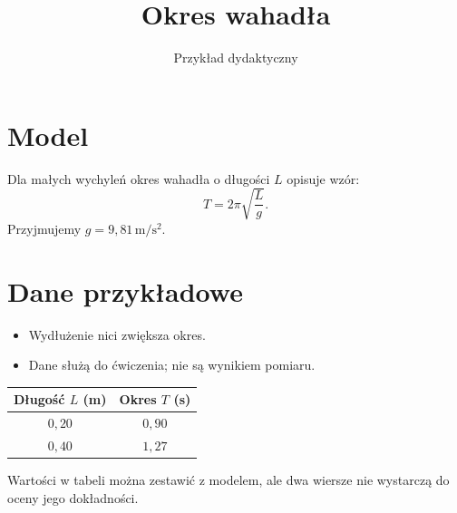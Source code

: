 \documentclass[a4paper,11pt]{article}
\title{Okres wahadła}
\author{Przykład dydaktyczny}
\date{}
\begin{document}
\maketitle
\section{Model}
Dla małych wychyleń okres wahadła o długości $L$ opisuje wzór:
\[
T=2\pi\sqrt{\frac{L}{g}}.
\]
Przyjmujemy $g=9{,}81\,\mathrm{m/s^2}$.
\section{Dane przykładowe}
\begin{itemize}
\item Wydłużenie nici zwiększa okres.
\item Dane służą do ćwiczenia; nie są wynikiem pomiaru.
\end{itemize}
\begin{center}
\begin{tabular}{cc}
\toprule
Długość $L$ (m) & Okres $T$ (s) \\
\midrule
$0{,}20$ & $0{,}90$ \\
$0{,}40$ & $1{,}27$ \\
\bottomrule
\end{tabular}
\end{center}
Wartości w tabeli można zestawić z modelem, ale dwa wiersze nie
wystarczą do oceny jego dokładności.
\end{document}
